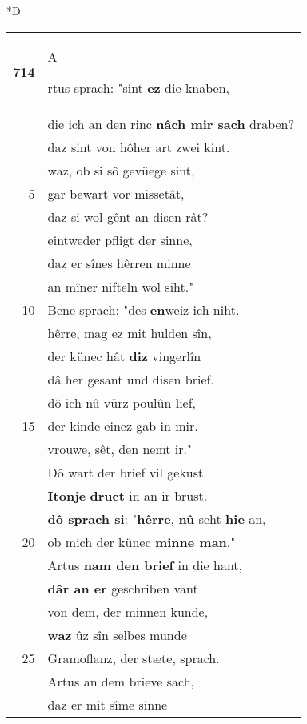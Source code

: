 \documentclass[8pt,a4paper,notitlepage]{article}
\begin{document}
\begin{table}[ht]
\begin{minipage}[t]{0.5\linewidth}
\small
\begin{center}*D
\end{center}
\begin{tabular}{rl}
\textbf{714} & \begin{large}A\end{large}rtus sprach: "sint \textbf{ez} die knaben,\\ 
 & die ich an den rinc \textbf{nâch mir sach} draben?\\ 
 & daz sint von hôher art zwei kint.\\ 
 & waz, ob si sô gevüege sint,\\ 
5 & gar bewart vor missetât,\\ 
 & daz si wol gênt an disen rât?\\ 
 & eintweder pfligt der sinne,\\ 
 & daz er sînes hêrren minne\\ 
 & an mîner nifteln wol siht."\\ 
10 & Bene sprach: "des \textbf{en}weiz ich niht.\\ 
 & hêrre, mag ez mit hulden sîn,\\ 
 & der künec hât \textbf{diz} vingerlîn\\ 
 & dâ her gesant und disen brief.\\ 
 & dô ich nû vürz poulûn lief,\\ 
15 & der kinde einez gab in mir.\\ 
 & vrouwe, sêt, den nemt ir."\\ 
 & Dô wart der brief vil gekust.\\ 
 & \textbf{Itonje} \textbf{druct} in an ir brust.\\ 
 & \textbf{dô sprach si}: "\textbf{hêrre}, \textbf{nû} seht \textbf{hie} an,\\ 
20 & ob mich der künec \textbf{minne man}."\\ 
 & Artus \textbf{nam den brief} in die hant,\\ 
 & \textbf{dâr an er} geschriben vant\\ 
 & von dem, der minnen kunde,\\ 
 & \textbf{waz} ûz sîn selbes munde\\ 
25 & Gramoflanz, der stæte, sprach.\\ 
 & Artus an dem brieve sach,\\ 
 & daz er mit sîme sinne\\ 

\end{tabular}
\end{minipage}
\end{table}
\end{document}
